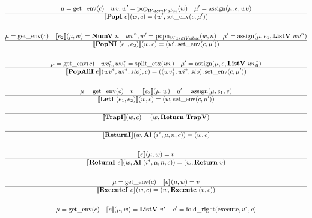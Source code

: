 \begin{gather*}
  \mu = \getenv(c) \quad
  wv, w' = \pop_{WasmValue}(w) \quad
  \mu' = \assign(\mu, e, wv) \\
  \hline
  \sem{\popi ~ e}(w, c) = (w', \setenv(c, \mu')) \\
%
\newline \\
  \mu = \getenv(c) \quad
  \sem{e_2}(\mu, w) = \numv ~ n \quad
  wv^n, w' = \popn_{WasmValue}(w, n) \quad
  \mu' = \assign(\mu, e_1, \listv ~ wv^n) \\
  \hline
  \sem{\popni ~ (e_1, e_2)}(w, c) = (w', \setenv(c, \mu')) \\
%
\newline \\
  \mu = \getenv(c) \quad
  \seq{wv_0}, \seq{wv_1} = \splitctx(wv) \quad
  \mu' = \assign(\mu, e, \listv ~ \seq{wv_0}) \\
  \hline
  \sem{\popalli ~ e}(\seq{wv}, \seq{wi}, sto), c)
  =
  ((\seq{wv_1}, \seq{wi}, sto), \setenv(c, \mu')) \\
%
\newline \\
  \mu = \getenv(c) \quad
  v = \sem{e_2}(\mu, w) \quad
  \mu' = \assign(\mu, e_1, v) \\
  \hline
  \sem{\leti ~ (e_1, e_2)}(w, c)
  =
  (w, \setenv(c, \mu')) \\
%
\newline \\
  \hline
  \sem{\trapi}(w, c) = (w, \ret ~ \trapv) \\
%
\newline \\
  \hline
  \sem{\returni}(w, \al~ (\seq{i}, \mu, n, c)) = (w, c) \\
%
\newline \\
  \sem{e}(\mu, w) = v \\
  \hline
  \sem{\returni ~ e}(w, \al ~ (\seq{i}, \mu, n, c)) = (w, \ret ~ v) \\
%
\newline \\
  \mu = \getenv(c) \quad
  \sem{e}(\mu, w) = v \\
  \hline
  \sem{\executei ~ e}(w, c) = (w, \exe ~ (v, c)) \\
%
\newline \\
  \mu = \getenv(c) \quad
  \sem{e}(\mu, w) = \listv ~ \seq v \quad
  c' = \fold(\execute, \seq v, c) \\

\end{gather*}
